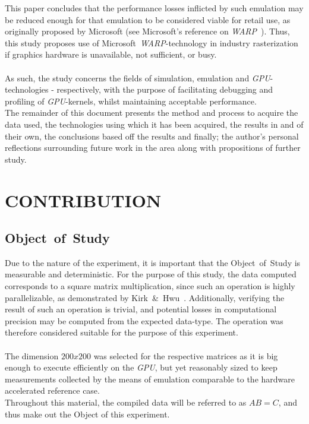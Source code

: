 \documentclass[a4paper,twocolumn,10pt]{article}
\begin{document}
This paper concludes that the performance losses inflicted by such emulation may be reduced enough for that emulation to be considered viable for retail use, as originally proposed by Microsoft (see Microsoft's reference on \textit{WARP}~). Thus, this study proposes use of Microsoft~\textit{WARP}-technology in industry rasterization if graphics hardware is unavailable, not sufficient, or busy.\\
\\
As such, the study concerns the fields of simulation, emulation and \textit{GPU}-technologies - respectively, with the purpose of facilitating debugging and profiling of \textit{GPU}-kernels, whilst maintaining acceptable performance.\\
The remainder of this document presents the method and process to acquire the data used, the technologies using which it has been acquired, the results in and of their own, the conclusions based off the results and finally; the author's personal reflections surrounding future work in the area along with propositions of further study.

\section{CONTRIBUTION}
\label{sec:contribution}

\subsection{Object~of~Study}
\label{sec:contribution:objectofstudy}
Due to the nature of the experiment, it is important that the Object~of~Study is measurable and deterministic. For the purpose of this study, the data computed corresponds to a square matrix multiplication, since such an operation is highly parallelizable, as demonstrated by Kirk~\&~Hwu~\cite[ch.~3]{Kirk:2010:PMP:1841511}. Additionally, verifying the result of such an operation is trivial, and potential losses in computational precision may be computed from the expected data-type. The operation was therefore considered suitable for the purpose of this experiment.\\
\\
The dimension $200x200$ was selected for the respective matrices as it is big enough to execute efficiently on the \textit{GPU}, but yet reasonably sized to keep measurements collected by the means of emulation comparable to the hardware accelerated reference case.\\
Throughout this material, the compiled data will be referred to as $AB=C$, and thus make out the Object of this experiment.
\end{document}
